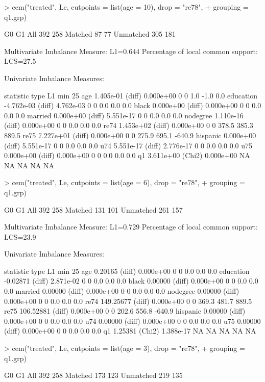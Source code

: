 \documentclass[article]{jss}
\begin{document}
\begin{Schunk}
\begin{Sinput}
> cem("treated", Le, cutpoints = list(age = 10), drop = "re78", 
+     grouping = q1.grp)
\end{Sinput}
\begin{Soutput}
           G0  G1
All       392 258
Matched    87  77
Unmatched 305 181


Multivariate Imbalance Measure: L1=0.644
Percentage of local common support: LCS=27.5%

Univariate Imbalance Measures:

           statistic   type        L1 min 25%
age        1.405e-01 (diff) 0.000e+00   0   0   1.0  -1.0    0.0
education -4.762e-03 (diff) 4.762e-03   0   0   0.0   0.0    0.0
black      0.000e+00 (diff) 0.000e+00   0   0   0.0   0.0    0.0
married    0.000e+00 (diff) 5.551e-17   0   0   0.0   0.0    0.0
nodegree   1.110e-16 (diff) 0.000e+00   0   0   0.0   0.0    0.0
re74       1.453e+02 (diff) 0.000e+00   0   0 378.5 385.3  889.5
re75       7.227e+01 (diff) 0.000e+00   0   0 275.9 695.1 -640.9
hispanic   0.000e+00 (diff) 5.551e-17   0   0   0.0   0.0    0.0
u74        5.551e-17 (diff) 2.776e-17   0   0   0.0   0.0    0.0
u75        0.000e+00 (diff) 0.000e+00   0   0   0.0   0.0    0.0
q1         3.611e+00 (Chi2) 0.000e+00  NA  NA    NA    NA     NA
\end{Soutput}
\begin{Sinput}
> cem("treated", Le, cutpoints = list(age = 6), drop = "re78", 
+     grouping = q1.grp)
\end{Sinput}
\begin{Soutput}
           G0  G1
All       392 258
Matched   131 101
Unmatched 261 157


Multivariate Imbalance Measure: L1=0.729
Percentage of local common support: LCS=23.9%

Univariate Imbalance Measures:

          statistic   type        L1 min 25%
age         0.20165 (diff) 0.000e+00   0   0   0.0   0.0    0.0
education  -0.02871 (diff) 2.871e-02   0   0   0.0   0.0    0.0
black       0.00000 (diff) 0.000e+00   0   0   0.0   0.0    0.0
married     0.00000 (diff) 0.000e+00   0   0   0.0   0.0    0.0
nodegree    0.00000 (diff) 0.000e+00   0   0   0.0   0.0    0.0
re74      149.25677 (diff) 0.000e+00   0   0 369.3 481.7  889.5
re75      106.52881 (diff) 0.000e+00   0   0 202.6 556.8 -640.9
hispanic    0.00000 (diff) 0.000e+00   0   0   0.0   0.0    0.0
u74         0.00000 (diff) 0.000e+00   0   0   0.0   0.0    0.0
u75         0.00000 (diff) 0.000e+00   0   0   0.0   0.0    0.0
q1          1.25381 (Chi2) 1.388e-17  NA  NA    NA    NA     NA
\end{Soutput}
\begin{Sinput}
> cem("treated", Le, cutpoints = list(age = 3), drop = "re78", 
+     grouping = q1.grp)
\end{Sinput}
\begin{Soutput}
           G0  G1
All       392 258
Matched   173 123
Unmatched 219 135



\end{Soutput}
\end{Schunk}
\end{document}
